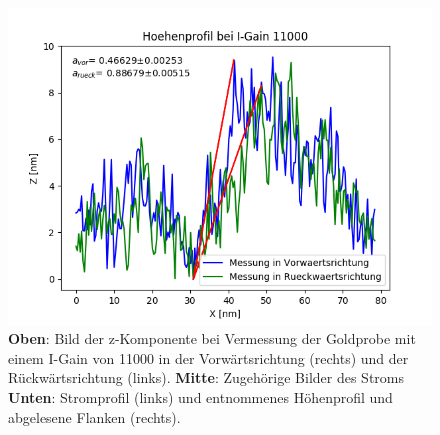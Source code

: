 \documentclass[12pt,a4paper]{article}
\begin{document}
\begin{figure}[H]
\includegraphics[scale=0.5]{Bilder/Anhang/IGain/Profil_IGain_11000.png}
\caption{\textbf{Oben}: Bild der z-Komponente bei Vermessung der Goldprobe mit einem I-Gain von 11000 in der Vorwärtsrichtung (rechts) und der Rückwärtsrichtung (links). \textbf{Mitte}: Zugehörige Bilder des Stroms \textbf{Unten}: Stromprofil (links) und entnommenes Höhenprofil und abgelesene Flanken (rechts).}
\end{figure}
\end{document}

